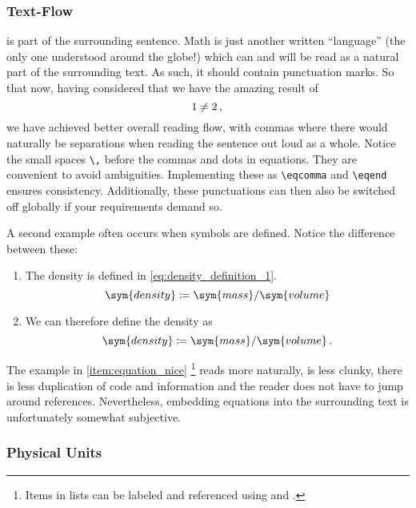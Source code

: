 \subsubsection{Text-Flow}

 is part of the surrounding sentence.
Math is just another written \enquote{language} (the only one understood around
the globe!) which can and will be read as a natural part of the surrounding text.
As such, it should contain punctuation marks.
So that now, having considered that we have the amazing result of
\begin{equation}
    \num{1} \neq \num{2} \,,{}
\end{equation}
we have achieved better overall reading flow, with commas where there would
naturally be separations when reading the sentence out loud as a whole.
Notice the small spaces \verb|\,| before the commas and dots in equations.
They are convenient to avoid ambiguities.
Implementing these as \verb|\eqcomma| and \verb|\eqend| ensures consistency.
Additionally, these punctuations can then also be switched off globally if your
requirements demand so.

A second example often occurs when symbols are defined.
Notice the difference between these:
\begin{enumerate}
    \item The density  is defined in \cref{eq:density_definition_1}.
        \begin{equation}\label{eq:density_definition_1}
            \sym{density} \coloneq \sym{mass} / \sym{volume}
        \end{equation}
    \item \label{item:equation_nice} We can therefore define the density as
        \begin{equation}
            \sym{density} \coloneq \sym{mass} / \sym{volume} \eqend{}
        \end{equation}
\end{enumerate}
The example in \cref{item:equation_nice}%
\footnote{%
    Items in lists can be labeled and referenced using  and
    .%
}
reads more naturally, is less clunky, there is less duplication of code and
information and the reader does not have to jump around references.
Nevertheless, embedding equations into the surrounding text is unfortunately
somewhat subjective.

\subsubsection{Physical Units}

